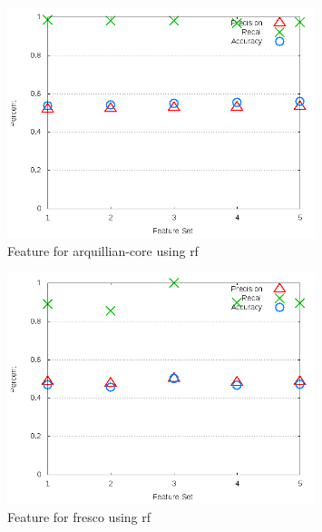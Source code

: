 \begin{figure}[!t]
\centering
\includegraphics[width=0.8\textwidth]{images/rf/test_3/arquillian-core_sample_range.png}
\caption{Feature for arquillian-core using \gls{rf}}
\label{fig:test_3_arquillian-core_rf}
\end{figure}

\begin{figure}[!t]
\centering
\includegraphics[width=0.8\textwidth]{images/rf/test_3/fresco_sample_range.png}
\caption{Feature for fresco using \gls{rf}}
\label{fig:test_3_fresco_rf}
\end{figure}

